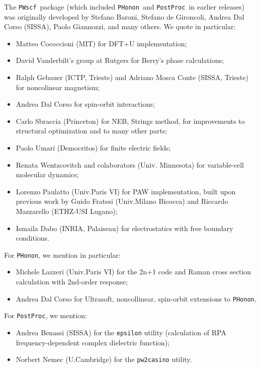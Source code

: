 \documentclass[12pt,a4paper]{article}
\def\PWscf{\texttt{PWscf}}
\def\PHonon{\texttt{PHonon}}
\def\PostProc{\texttt{PostProc}}
\begin{document}
The \PWscf\ package (which included \PHonon\ and \PostProc\
in earlier releases)
was originally developed by Stefano Baroni, Stefano
de Gironcoli, Andrea Dal Corso (SISSA), Paolo Giannozzi, and many others.
We quote in particular:
\begin{itemize}
  \item Matteo Cococcioni (MIT) for DFT+U implementation;
  \item David Vanderbilt's group at Rutgers for Berry's phase
  calculations;
  \item Ralph Gebauer (ICTP, Trieste) and Adriano Mosca Conte
  (SISSA, Trieste) for noncolinear magnetism;
  \item Andrea Dal Corso for spin-orbit interactions;
  \item Carlo Sbraccia (Princeton) for NEB, Strings method,
  for improvements to structural optimization
  and to many other parts;
  \item Paolo Umari (Democritos) for finite electric fields;
  \item Renata Wentzcovitch and colaborators (Univ. Minnesota)
  for variable-cell molecular dynamics;
  \item Lorenzo Paulatto (Univ.Paris VI) for PAW implementation, 
  built  upon previous work by Guido Fratesi (Univ.Milano Bicocca)
  and Riccardo Mazzarello (ETHZ-USI Lugano);
 \item Ismaila Dabo (INRIA, Palaiseau) for electrostatics with
 free boundary conditions.
\end{itemize}
For \PHonon, we mention in particular: 
\begin{itemize}
  \item Michele Lazzeri (Univ.Paris VI) for the 2n+1 code and Raman 
  cross section calculation with 2nd-order response;
 \item Andrea Dal Corso for Ultrasoft, noncollinear, spin-orbit
 extensions to \PHonon.
 \end{itemize}
For \PostProc, we mention:
\begin{itemize}
\item Andrea Benassi (SISSA) for the \texttt{epsilon} utility 
(calculation of RPA frequency-dependent complex dielectric
function);
\item Norbert Nemec (U.Cambridge) for the \texttt{pw2casino} 
utility.
\end{itemize}
\end{document}

